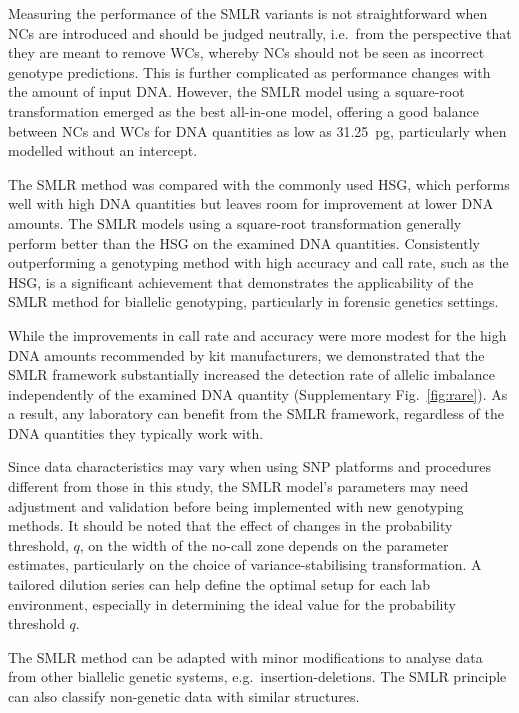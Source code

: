 \documentclass[preprint,5p,times,11pt]{elsarticle}
\begin{document}
Measuring the performance of the SMLR variants is not straightforward when NCs are introduced and should be judged neutrally, i.e.~from the perspective that they are meant to remove WCs, whereby NCs should not be seen as incorrect genotype predictions.
This is further complicated as performance changes with the amount of input DNA.
However, the SMLR model using a square-root transformation emerged as the best all-in-one model, offering a good balance between NCs and WCs for DNA quantities as low as \SI{31.25}{\pg}, particularly when modelled without an intercept.

The SMLR method was compared with the commonly used HSG, which performs well with high DNA quantities but leaves room for improvement at lower DNA amounts.
The SMLR models using a square-root transformation generally perform better than the HSG on the examined DNA quantities.
Consistently outperforming a genotyping method with high accuracy and call rate, such as the HSG, is a significant achievement that demonstrates the applicability of the SMLR method for biallelic genotyping, particularly in forensic genetics settings.

While the improvements in call rate and accuracy were more modest for the high DNA amounts recommended by kit manufacturers, we demonstrated that the SMLR framework substantially increased the detection rate of allelic imbalance independently of the examined DNA quantity (Supplementary Fig.~\ref{fig:rare}).
As a result, any laboratory can benefit from the SMLR framework, regardless of the DNA quantities they typically work with.

Since data characteristics may vary when using SNP platforms and procedures different from those in this study, the SMLR model's parameters may need adjustment and validation before being implemented with new genotyping methods.
It should be noted that the effect of changes in the probability threshold, $q$, on the width of the no-call zone depends on the parameter estimates, particularly on the choice of variance-stabilising transformation.
A tailored dilution series can help define the optimal setup for each lab environment, especially in determining the ideal value for the probability threshold $q$.

The SMLR method can be adapted with minor modifications to analyse data from other biallelic genetic systems, e.g.~insertion-deletions.
The SMLR principle can also classify non-genetic data with similar structures.\\
\end{document}
